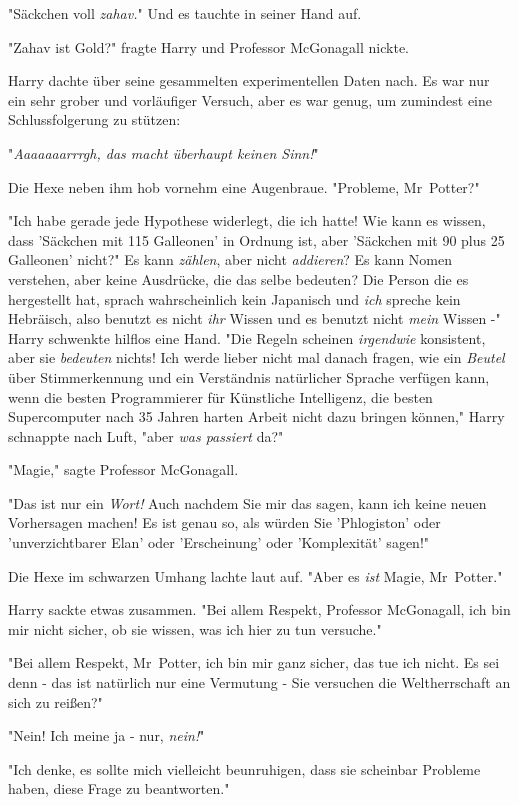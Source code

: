 {"Säckchen voll \emph{zahav.}" Und es tauchte in seiner Hand auf.

"Zahav ist Gold?" fragte Harry und Professor McGonagall nickte.

Harry dachte über seine gesammelten experimentellen Daten nach. Es war nur ein sehr grober und vorläufiger Versuch, aber es war genug, um zumindest eine Schlussfolgerung zu stützen:

"\emph{Aaaaaaarrrgh, das macht überhaupt keinen Sinn!}"

Die Hexe neben ihm hob vornehm eine Augenbraue. "Probleme, Mr~Potter?"

"Ich habe gerade jede Hypothese widerlegt, die ich hatte! Wie kann es wissen, dass 'Säckchen mit 115 Galleonen' in Ordnung ist, aber 'Säckchen mit 90 plus 25 Galleonen' nicht?" Es kann \emph{zählen}, aber nicht \emph{addieren}? Es kann Nomen verstehen, aber keine Ausdrücke, die das selbe bedeuten? Die Person die es hergestellt hat, sprach wahrscheinlich kein Japanisch und \emph{ich} spreche kein Hebräisch, also benutzt es nicht \emph{ihr} Wissen und es benutzt nicht \emph{mein} Wissen -" Harry schwenkte hilflos eine Hand. "Die Regeln scheinen \emph{irgendwie} konsistent, aber sie \emph{bedeuten} nichts! Ich werde lieber nicht mal danach fragen, wie ein \emph{Beutel} über Stimmerkennung und ein Verständnis natürlicher Sprache verfügen kann, wenn die besten Programmierer für Künstliche Intelligenz, die besten Supercomputer nach 35 Jahren harten Arbeit nicht dazu bringen können," Harry schnappte nach Luft, "aber \emph{was passiert} da?"

"Magie," sagte Professor McGonagall.

"Das ist nur ein \emph{Wort!} Auch nachdem Sie mir das sagen, kann ich keine neuen Vorhersagen machen! Es ist genau so, als würden Sie 'Phlogiston' oder 'unverzichtbarer Elan' oder 'Erscheinung' oder 'Komplexität' sagen!"

Die Hexe im schwarzen Umhang lachte laut auf. "Aber es \emph{ist} Magie, Mr~Potter."

Harry sackte etwas zusammen. "Bei allem Respekt, Professor McGonagall, ich bin mir nicht sicher, ob sie wissen, was ich hier zu tun versuche."

"Bei allem Respekt, Mr~Potter, ich bin mir ganz sicher, das tue ich nicht. Es sei denn - das ist natürlich nur eine Vermutung - Sie versuchen die Weltherrschaft an sich zu reißen?"

"Nein! Ich meine ja - nur, \emph{nein!}"

"Ich denke, es sollte mich vielleicht beunruhigen, dass sie scheinbar Probleme haben, diese Frage zu beantworten."

}
